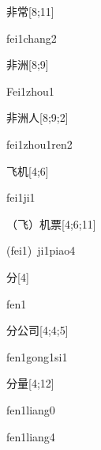 \begin{verbete}{非常}[8;11]
\begin{pronuncia}{fei1chang2}
\end{pronuncia}
\end{verbete}

\begin{verbete}{非洲}[8;9]
\begin{pronuncia}{Fei1zhou1}
\end{pronuncia}
\end{verbete}

\begin{verbete}{非洲人}[8;9;2]
\begin{pronuncia}{fei1zhou1ren2}
\end{pronuncia}
\end{verbete}

\begin{verbete}[fei1ji1]{飞机}[4;6]
\begin{pronuncia}{fei1ji1}
\end{pronuncia}
\end{verbete}

\begin{verbete}{（飞）机票}[4;6;11]
\begin{pronuncia}[\\]{(fei1)\ ji1piao4}
\end{pronuncia}
\end{verbete}

\begin{verbete}[fen1]{分}[4]
\begin{pronuncia}{fen1}
\end{pronuncia}
\end{verbete}

\begin{verbete}{分公司}[4;4;5]
\begin{pronuncia}{fen1gong1si1}
\end{pronuncia}
\end{verbete}

\begin{verbete}{分量}[4;12]
\begin{pronuncia}{fen1liang0}
\end{pronuncia}
\begin{pronuncia}{fen1liang4}
\end{pronuncia}
\end{verbete}

